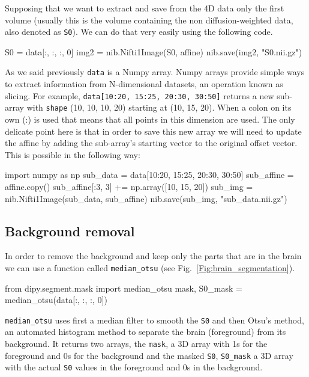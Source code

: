 \documentclass{bioinfo}
\begin{document}
Supposing that we want to extract and save from the 4D data only the first
volume (usually this is the volume containing the non diffusion-weighted data,
also denoted as \texttt{S0}). We can do that very easily using the following code.
\begin{python}
S0 = data[:, :, :, 0]
img2 = nib.Nifti1Image(S0, affine)
nib.save(img2, "S0.nii.gz")
\end{python}
As we said previously \texttt{data} is a Numpy array. Numpy arrays provide
simple ways to extract information from N-dimensional datasets, an operation
known as slicing. For example, \texttt{data[10:20, 15:25, 20:30, 30:50]}
returns a new sub-array with \texttt{shape} (10, 10, 10, 20) starting at (10, 15, 20). When a
colon on its own (:) is used that means that all points in this dimension are used. The
only delicate point here is that in order to save this new array we will need
to update the affine by adding the sub-array's starting vector to the original offset vector. This is possible in the following way:
\begin{python}
import numpy as np
sub_data = data[10:20, 15:25, 20:30, 30:50]
sub_affine = affine.copy()
sub_affine[:3, 3] += np.array([10, 15, 20])
sub_img = nib.Nifti1Image(sub_data, sub_affine)
nib.save(sub_img, "sub_data.nii.gz")
\end{python}

\subsection{Background removal}
In order to remove the background and keep only the parts that are in the brain
we can use a function called \texttt{median\_otsu} (see Fig.~\ref{Fig:brain_segmentation}).
\begin{python}
from dipy.segment.mask import median_otsu
mask, S0_mask = median_otsu(data[:, :, :, 0])
\end{python}
\texttt{median\_otsu} uses first a median filter to smooth the \texttt{S0} and
then Otsu's method, an automated histogram method \citep{Otsu1979} to separate
the brain (foreground) from its background. It returns two arrays, the
\texttt{mask}, a 3D array with 1s for the foreground and 0s for the background
and the masked \texttt{S0}, \texttt{S0\_mask} a 3D array with the actual
\texttt{S0} values in the foreground and 0s in the background.
\end{document}
